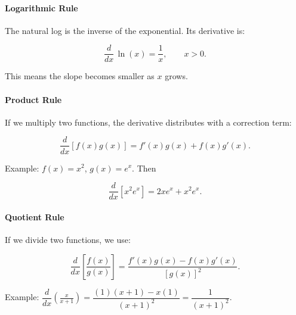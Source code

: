 \documentclass[11pt,letterpaper]{article}
\begin{document}
\paragraph{Logarithmic Rule}
The natural log is the inverse of the exponential. Its derivative is:

\begin{equation*}
    \frac{d}{dx}\,\ln(x) = \frac{1}{x}, \qquad x > 0.
\end{equation*}

\noindent This means the slope becomes smaller as $x$ grows.

\begin{center}
\end{center}

\paragraph{Product Rule} 
If we multiply two functions, the derivative distributes with a correction term:

\begin{equation*}
    \frac{d}{dx}[f(x) g(x)] = f'(x)g(x) + f(x)g'(x).
\end{equation*}

\noindent Example: $f(x) = x^2$, $g(x)=e^x$. Then

\[
\frac{d}{dx}[x^2 e^x] = 2x e^x + x^2 e^x.
\]

\paragraph{Quotient Rule} 
If we divide two functions, we use:

\begin{equation*}
    \frac{d}{dx}\left[\frac{f(x)}{g(x)}\right] = \frac{f'(x) g(x) - f(x) g'(x)}{[g(x)]^2}.
\end{equation*}

\noindent Example: $\dfrac{d}{dx}\left(\tfrac{x}{x+1}\right) = \dfrac{(1)(x+1) - x(1)}{(x+1)^2} = \dfrac{1}{(x+1)^2}$.
\end{document}
